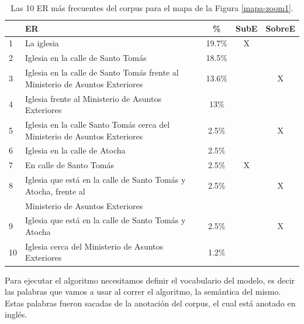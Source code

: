 \begin{table}[H]
{\footnotesize
\begin{center}
\begin{tabular}{|l|l|c|c|c|}
\hline
&ER 					       &  \% & SubE & SobreE\\ \hline \hline
1&La iglesia 																																		 &19.7\%  & X & \\ \hline
2&Iglesia en la calle de Santo Tom\'as																									 &18.5\% 	&  & \\ \hline
3&Iglesia en la calle de Santo Tom\'as frente al Ministerio de Asuntos Exteriores        &13.6\% &  &X \\ \hline
4&Iglesia frente al Ministerio de Asuntos Exteriores 													 &13\% &  & \\ \hline
5&Iglesia en la calle Santo Tom\'as cerca del Ministerio de Asuntos Exteriores        &2.5\% &  &X \\ \hline
6&Iglesia en la calle de Atocha																									 &2.5\%  &  & \\ \hline
7&En calle de Santo Tom\'as 																													 &2.5\% 	& X & \\ \hline
8&Iglesia que est\'a en la calle de Santo Tom\'as y Atocha, frente al 									 &2.5\%	&  &X \\ 
&Ministerio de Asuntos Exteriores																		 &&& \\ \hline
9&Iglesia que est\'a en la calle de Santo Tom\'as y Atocha										 &2.5\% 	&  &X \\ \hline
10&Iglesia cerca del Ministerio de Asuntos Exteriores														 &1.2\% 	&  & \\ \hline
\end{tabular}
\caption{Las 10 ER m\'as frecuentes del corpus para el mapa de la Figura \ref{mapa-zoom1}.}\label{freq-mapa}
\end{center}
}%
\end{table}

\vspace*{-0.5cm}
Para ejecutar el algoritmo necesitamos definir el vocabulario del modelo, es decir las palabras que vamos a usar al correr el algoritmo, la sem\'antica del mismo. Estas palabras fueron sacadas de la anotaci\'on del corpus, el cual est\'a anotado en ingl\'es.\\

